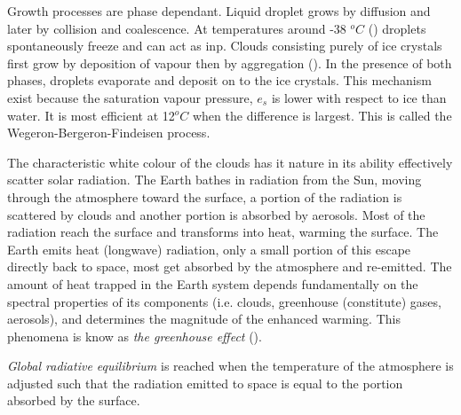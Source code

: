 Growth processes are phase dependant. Liquid droplet grows by diffusion and later by collision and coalescence. At temperatures around -38 $^oC$ (\cite{lohmann2016}) droplets spontaneously freeze and can act as \acrshort{inp}. Clouds consisting purely of ice crystals first grow by deposition of vapour then by aggregation (\cite{Fowler1996LiquidAssumptions}). In the presence of both phases, droplets evaporate and deposit on to the ice crystals.
This mechanism exist because the saturation vapour pressure, $e_s$ is lower with respect to ice than water. It is most efficient at 12$^oC$ when the difference is largest. This is called the Wegeron-Bergeron-Findeisen process.

The characteristic white colour of the clouds has it nature in its ability effectively scatter solar radiation. %
The Earth bathes in radiation from the Sun, moving through the atmosphere toward the surface, a portion of the radiation is scattered by clouds and another portion is absorbed by aerosols. Most of the radiation reach the surface and transforms into heat, warming the surface. The Earth emits heat (longwave) radiation, only a small portion of this escape directly back to space, most get absorbed by the atmosphere and re-emitted. The amount of heat trapped in the Earth system depends fundamentally on the spectral properties of its components (i.e. clouds, greenhouse (constitute) gases, aerosols), and determines the magnitude of the enhanced warming. This phenomena is know as \textit{the greenhouse effect} (\cite{greenhouse_effect}). 

\textit{Global radiative equilibrium} is reached when the temperature of the atmosphere is adjusted such that the radiation emitted to space is equal to the portion absorbed by the surface.

